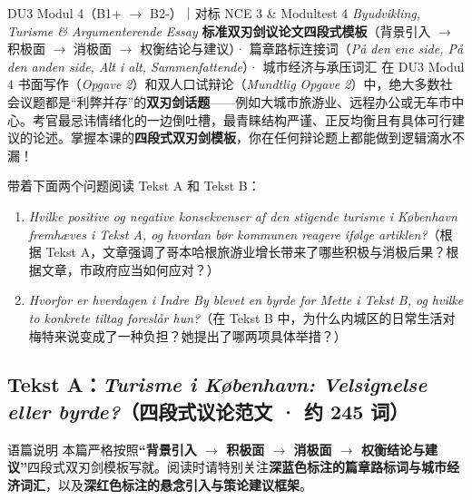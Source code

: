 {DU3 Modul 4（B1+ $\rightarrow$ B2-）｜对标 NCE 3 \& Modultest 4 \textit{Byudvikling, Turisme \& Argumenterende Essay}}
{\textbf{标准双刃剑议论文四段式模板}（背景引入 $\rightarrow$ 积极面 $\rightarrow$ 消极面 $\rightarrow$ 权衡结论与建议）· 篇章路标连接词（\textit{På den ene side, På den anden side, Alt i alt, Sammenfattende}）· 城市经济与承压词汇}
{在 DU3 Modul 4 书面写作（\textit{Opgave 2}）和双人口试辩论（\textit{Mundtlig Opgave 2}）中，绝大多数社会议题都是“利弊并存”的\textbf{双刃剑话题}——例如大城市旅游业、远程办公或无车市中心。考官最忌讳情绪化的一边倒吐槽，最青睐结构严谨、正反均衡且有具体可行建议的论述。掌握本课的\textbf{四段式双刃剑模板}，你在任何辩论题上都能做到逻辑滴水不漏！}

\begin{foerduleaeser}
带着下面两个问题阅读 Tekst A 和 Tekst B：
\begin{enumerate}
  \item \textit{Hvilke positive og negative konsekvenser af den stigende turisme i København fremhæves i Tekst A, og hvordan bør kommunen reagere ifølge artiklen?}（根据 Tekst A，文章强调了哥本哈根旅游业增长带来了哪些积极与消极后果？根据文章，市政府应当如何应对？）
  \item \textit{Hvorfor er hverdagen i Indre By blevet en byrde for Mette i Tekst B, og hvilke to konkrete tiltag foreslår hun?}（在 Tekst B 中，为什么内城区的日常生活对梅特来说变成了一种负担？她提出了哪两项具体举措？）
\end{enumerate}
\end{foerduleaeser}


\subsection*{Tekst A：\textit{Turisme i København: Velsignelse eller byrde?}（四段式议论范文 · 约 245 词）}

\begin{tipbox}{语篇说明}
本篇严格按照\textbf{“背景引入 $\rightarrow$ 积极面 $\rightarrow$ 消极面 $\rightarrow$ 权衡结论与建议”}四段式双刃剑模板写就。阅读时请特别关注\textbf{\color{NCDNavy}深蓝色标注的篇章路标词与城市经济词汇}，以及\textbf{\color{NCDRed}深红色标注的悬念引入与策论建议框架}。
\end{tipbox}

